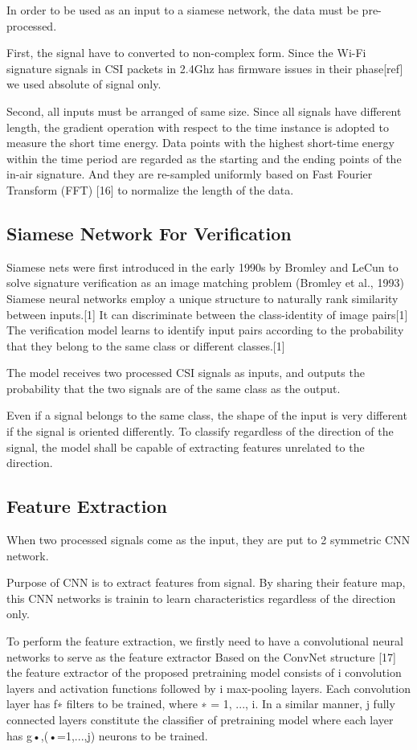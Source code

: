 \documentclass[runningheads]{llncs}
\begin{document}
In order to be used as an input to a siamese network, the data must be pre-processed.

First, the signal have to converted to non-complex form.
Since the Wi-Fi signature signals in CSI packets in 2.4Ghz has firmware issues in their phase[ref] we used absolute of signal only.

Second, all inputs must be arranged of same size.
Since all signals have different length, the gradient operation with respect to the time instance is adopted to measure the short time energy. 
Data points with the highest short-time energy within the time period are regarded as the starting and the ending points of the in-air signature.
And they are re-sampled uniformly based on Fast Fourier Transform (FFT) [16] to normalize the length of the data. 

\subsection{Siamese Network For Verification}
Siamese nets were first introduced in the early 1990s by Bromley and LeCun to solve signature verification as an image matching problem (Bromley et al., 1993)
Siamese neural networks employ a unique structure to naturally rank similarity between inputs.[1] 
It can discriminate between the class-identity of image pairs[1]
The verification model learns to identify input pairs according to the probability that they belong to the same class or different classes.[1]


The model receives two processed CSI signals as inputs, and outputs the probability that the two signals are of the same class as the output.

Even if a signal belongs to the same class, the shape of the input is very different if the signal is oriented differently.
To classify regardless of the direction of the signal, the model shall be capable of extracting features unrelated to the direction.
\subsection{Feature Extraction}
When two processed signals come as the input, they are put to 2 symmetric CNN network.

Purpose of CNN is to extract features from signal.
By sharing their feature map, this CNN networks is trainin to learn characteristics regardless of the direction only.

To perform the feature extraction, we firstly need to have a convolutional neural networks  to serve as the feature extractor
Based on the ConvNet structure [17] the feature extractor of the proposed pretraining model consists of i convolution layers and activation functions followed by i max-pooling layers. Each convolution layer has f∗ filters to be trained, where ∗ = 1, ..., i. In a similar manner, j fully connected layers constitute the classifier of pretraining model where each layer has g•,(•=1,...,j) neurons to be trained. 
\end{document}
